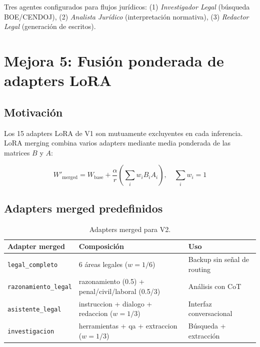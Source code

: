 \documentclass[11pt,a4paper]{article}
\begin{document}
Tres agentes configurados para flujos jurídicos: (1) \textit{Investigador Legal}
(búsqueda BOE/CENDOJ), (2) \textit{Analista Jurídico} (interpretación normativa),
(3) \textit{Redactor Legal} (generación de escritos).

\section{Mejora 5: Fusión ponderada de adapters LoRA}
\label{sec:lora_merge}

\subsection{Motivación}

Los 15 adapters LoRA de V1 son mutuamente excluyentes en cada inferencia.
LoRA merging combina varios adapters mediante media ponderada de las matrices
$B$ y $A$:

\begin{equation}
  W'_{\text{merged}} = W_{\text{base}} + \frac{\alpha}{r}
    \left(\sum_i w_i B_i A_i\right), \quad \sum_i w_i = 1
\end{equation}

\subsection{Adapters merged predefinidos}

\begin{table}[h]
\centering
\caption{Adapters merged para V2.}
\label{tab:merged}
\begin{tabular}{lll}
\toprule
\textbf{Adapter merged} & \textbf{Composición} & \textbf{Uso} \\
\midrule
\texttt{legal\_completo}     & 6 áreas legales ($w=1/6$)                     & Backup sin señal de routing \\
\texttt{razonamiento\_legal} & razonamiento (0.5) + penal/civil/laboral (0.5/3) & Análisis con CoT \\
\texttt{asistente\_legal}    & instruccion + dialogo + redaccion ($w=1/3$)   & Interfaz conversacional \\
\texttt{investigacion}       & herramientas + qa + extraccion ($w=1/3$)      & Búsqueda + extracción \\
\bottomrule
\end{tabular}
\end{table}
\end{document}
